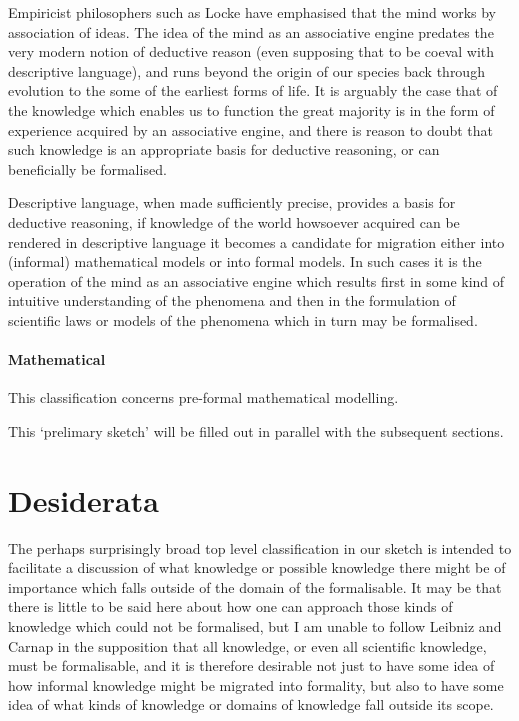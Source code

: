 \documentclass[numreferences]{rbjk}
\begin{document}
\begin{article}
Empiricist philosophers such as Locke have emphasised that the mind works by association of ideas.
The idea of the mind as an associative engine predates the very modern notion of deductive reason (even supposing that to be coeval with descriptive language), and runs beyond the origin of our species back through evolution to the some of the earliest forms of life.
It is arguably the case that of the knowledge which enables us to function the great majority is in the form of experience acquired by an associative engine, and there is reason to doubt that such knowledge is an appropriate basis for deductive reasoning, or can beneficially be formalised.

Descriptive language, when made sufficiently precise, provides a basis for deductive reasoning, if knowledge of the world howsoever acquired can be rendered in descriptive language it becomes a candidate for migration either into (informal) mathematical models or into formal models.
In such cases it is the operation of the mind as an associative engine which results first in some kind of intuitive understanding of the phenomena and then in the formulation of scientific laws or models of the phenomena which in turn may be formalised.

\paragraph{Mathematical}

This classification concerns pre-formal mathematical modelling.





This `prelimary sketch' will be filled out in parallel with the subsequent sections.

\section{Desiderata}

The perhaps surprisingly broad top level classification in our sketch is intended to facilitate a discussion of what knowledge or possible knowledge there might be of importance which falls outside of the domain of the formalisable.
It may be that there is little to be said here about how one can approach those kinds of knowledge which could not be formalised, but I am unable to follow Leibniz and Carnap in the supposition that all knowledge, or even all scientific knowledge, must be formalisable, and it is therefore desirable not just to have some idea of how informal knowledge might be migrated into formality, but also to have some idea of what kinds of knowledge or domains of knowledge fall outside its scope.


\end{article}
\end{document}
